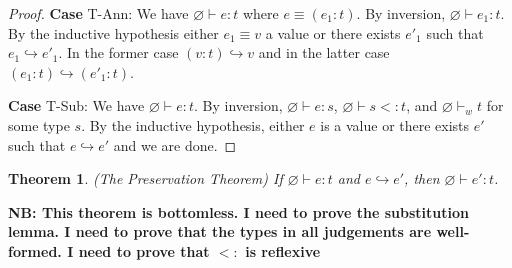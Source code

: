 \documentclass[11pt]{article}
\newtheorem{theorem}{Theorem}%
\newcommand{\col}{\mathbin{:}}       %
\begin{document}
\begin{proof}
{\bf Case} {\sc T-Ann}: We have $\varnothing \vdash e : t$ where $e \equiv (e_1\col t)$. By inversion, $\varnothing \vdash e_1 : t$. By the inductive hypothesis either $e_1 \equiv v$ a value or there exists $e'_1$ such that $e_1 \hookrightarrow e'_1$. In the former case $(v\col t) \hookrightarrow v$ and in the latter case $(e_1\col t) \hookrightarrow (e'_1\col t)$.

{\bf Case} {\sc T-Sub}: We have $\varnothing \vdash e : t$. By inversion, $\varnothing \vdash e : s$, $\varnothing \vdash s <: t$, and $\varnothing \vdash_w t$ for some type $s$. By the inductive hypothesis, either $e$ is a value or there exists $e'$ such that $e \hookrightarrow e'$ and we are done.
\end{proof}

\begin{theorem}(The Preservation Theorem)
If $\varnothing \vdash e : t$ and $e \hookrightarrow e'$, then $\varnothing \vdash e' : t$.	
\end{theorem} {\bf NB: This theorem is bottomless. I need to prove the substitution lemma. I need to prove that the types in all judgements are well-formed. I need to prove that $<:$ is reflexive}
\end{document}
